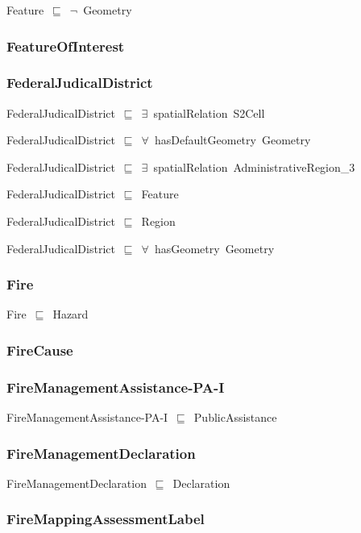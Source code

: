 \documentclass{article}
\begin{document}
Feature~\ensuremath{\sqsubseteq}~\ensuremath{\lnot}~Geometry

\subsubsection*{FeatureOfInterest}

\subsubsection*{FederalJudicalDistrict}

FederalJudicalDistrict~\ensuremath{\sqsubseteq}~\ensuremath{\exists}~spatialRelation~S2Cell~

FederalJudicalDistrict~\ensuremath{\sqsubseteq}~\ensuremath{\forall}~hasDefaultGeometry~Geometry~

FederalJudicalDistrict~\ensuremath{\sqsubseteq}~\ensuremath{\exists}~spatialRelation~AdministrativeRegion\_3~

FederalJudicalDistrict~\ensuremath{\sqsubseteq}~Feature~

FederalJudicalDistrict~\ensuremath{\sqsubseteq}~Region~

FederalJudicalDistrict~\ensuremath{\sqsubseteq}~\ensuremath{\forall}~hasGeometry~Geometry~

\subsubsection*{Fire}

Fire~\ensuremath{\sqsubseteq}~Hazard~

\subsubsection*{FireCause}

\subsubsection*{FireManagementAssistance-PA-I}

FireManagementAssistance-PA-I~\ensuremath{\sqsubseteq}~PublicAssistance~

\subsubsection*{FireManagementDeclaration}

FireManagementDeclaration~\ensuremath{\sqsubseteq}~Declaration~

\subsubsection*{FireMappingAssessmentLabel}
\end{document}
